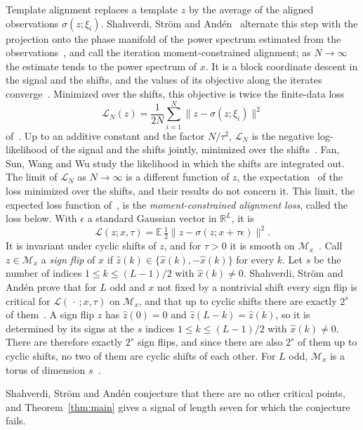 \documentclass[11pt]{article}
\theoremstyle{remark}
\newcommand{\E}{\mathbb{E}}
\newcommand{\R}{\mathbb{R}}
\begin{document}
Template alignment replaces a template $z$ by the average of the aligned observations $\sigma(z;\xi_i)$. Shahverdi, Str\"om and And\'en~\cite{SSA24} alternate this step with the projection onto the phase manifold of the power spectrum estimated from the observations~\cite[(2.3) and (4.2)]{SSA24}, and call the iteration moment-constrained alignment; as $N\to\infty$ the estimate tends to the power spectrum of $x$. It is a block coordinate descent in the signal and the shifts, and the values of its objective along the iterates converge~\cite[(4.3) and Proposition~4.1]{SSA24}. Minimized over the shifts, this objective is twice the finite-data loss
\[
\mathcal L_N(z)=\frac1{2N}\sum_{i=1}^N\bigl\|z-\sigma(z;\xi_i)\bigr\|^2
\]
of~\cite[(2.7)]{SSA24}. Up to an additive constant and the factor $N/\tau^2$, $\mathcal L_N$ is the negative log-likelihood of the signal and the shifts jointly, minimized over the shifts~\cite[Sections~1 and~4]{SSA24}. Fan, Sun, Wang and Wu study the likelihood in which the shifts are integrated out. The limit of $\mathcal L_N$ as $N\to\infty$ is a different function of $z$, the expectation~\cite[(2.9)]{SSA24} of the loss minimized over the shifts, and their results do not concern it. This limit, the expected loss function of~\cite[Definition~2.8]{SSA24}, is the \emph{moment-constrained alignment loss}, called the loss below. With $\epsilon$ a standard Gaussian vector in $\R^L$, it is~\cite[(2.11)]{SSA24}
\[
\mathcal L(z;x,\tau)=\E\,\tfrac12\bigl\|z-\sigma(z;x+\tau\epsilon)\bigr\|^2 .
\]
It is invariant under cyclic shifts of $z$, and for $\tau>0$ it is smooth on $\mathcal M_x$~\cite[Theorem~3.2]{SSA24}. Call $z\in\mathcal M_x$ a \emph{sign flip} of $x$ if $\widehat z(k)\in\{\widehat x(k),-\widehat x(k)\}$ for every $k$. Let $s$ be the number of indices $1\le k\le (L-1)/2$ with $\widehat x(k)\neq0$. Shahverdi, Str\"om and And\'en prove that for $L$ odd and $x$ not fixed by a nontrivial shift every sign flip is critical for $\mathcal L(\,\cdot\,;x,\tau)$ on $\mathcal M_x$, and that up to cyclic shifts there are exactly $2^{s}$ of them~\cite[Proposition~3.7]{SSA24}. A sign flip $z$ has $\widehat z(0)=0$ and $\widehat z(L-k)=\overline{\widehat z(k)}$, so it is determined by its signs at the $s$ indices $1\le k\le(L-1)/2$ with $\widehat x(k)\neq0$. There are therefore exactly $2^{s}$ sign flips, and since there are also $2^{s}$ of them up to cyclic shifts, no two of them are cyclic shifts of each other. For $L$ odd, $\mathcal M_x$ is a torus of dimension $s$~\cite[Remark~2.1]{SSA24}.

Shahverdi, Str\"om and And\'en conjecture that there are no other critical points, and Theorem~\ref{thm:main} gives a signal of length seven for which the conjecture fails.
\end{document}
